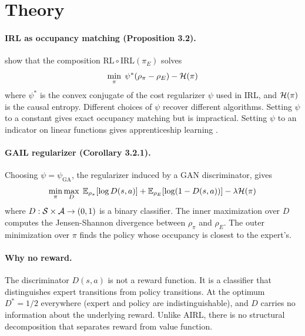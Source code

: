 \documentclass[11pt]{article}
\begin{document}
\section{Theory}

\paragraph{IRL as occupancy matching (Proposition 3.2).}
\citet{hoErmon2016} show that the composition $\text{RL} \circ \text{IRL}(\pi_E)$ solves
\begin{equation}
\label{eq:irl_dual}
\min_\pi \; \psi^*(\rho_\pi - \rho_E) - \mathcal{H}(\pi)
\end{equation}
where $\psi^*$ is the convex conjugate of the cost regularizer $\psi$ used in IRL, and $\mathcal{H}(\pi)$ is the causal entropy.
Different choices of $\psi$ recover different algorithms.
Setting $\psi$ to a constant gives exact occupancy matching but is impractical.
Setting $\psi$ to an indicator on linear functions gives apprenticeship learning \citep{abbeelNg2004}.

\paragraph{GAIL regularizer (Corollary 3.2.1).}
Choosing $\psi = \psi_{\text{GA}}$, the regularizer induced by a GAN discriminator, gives
\begin{equation}
\label{eq:gail_objective}
\min_\pi \max_D \; \mathbb{E}_{\rho_\pi}[\log D(s,a)] + \mathbb{E}_{\rho_E}[\log(1 - D(s,a))] - \lambda \mathcal{H}(\pi)
\end{equation}
where $D : \mathcal{S} \times \mathcal{A} \to (0,1)$ is a binary classifier.
The inner maximization over $D$ computes the Jensen-Shannon divergence between $\rho_\pi$ and $\rho_E$.
The outer minimization over $\pi$ finds the policy whose occupancy is closest to the expert's.

\paragraph{Why no reward.}
The discriminator $D(s,a)$ is not a reward function.
It is a classifier that distinguishes expert transitions from policy transitions.
At the optimum $D^* = 1/2$ everywhere (expert and policy are indistinguishable), and $D$ carries no information about the underlying reward.
Unlike AIRL, there is no structural decomposition that separates reward from value function.
\end{document}

